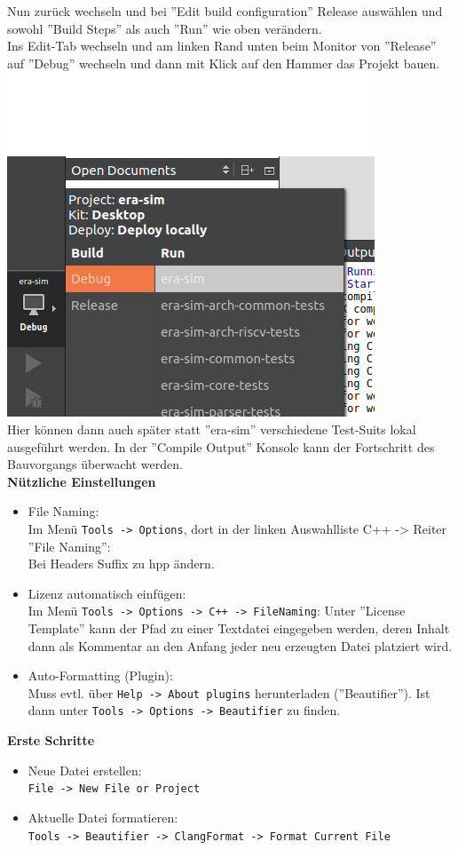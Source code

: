 Nun zurück wechseln und bei ''Edit build configuration'' Release auswählen und sowohl ''Build Steps'' als auch ''Run'' wie oben verändern.\\

Ins Edit-Tab wechseln und am linken Rand unten beim Monitor von ''Release'' auf ''Debug'' wechseln und dann mit Klick auf den Hammer das Projekt bauen.\\
\includegraphics[scale=0.7]{images/setup-qtcreator-change-buildrun-flavor.png}\\
Hier können dann auch später statt ''era-sim'' verschiedene Test-Suits lokal ausgeführt werden. In der ''Compile Output'' Konsole kann der Fortschritt des Bauvorgangs überwacht werden.\\


\textbf{Nützliche Einstellungen}\\
\begin{itemize}
	\item File Naming:\\
	Im Menü \texttt{Tools -> Options}, dort in der linken Auswahlliste C++ -> Reiter ''File Naming'':\\
	Bei Headers Suffix zu hpp ändern.
	\item Lizenz automatisch einfügen:\\
	Im Menü \texttt{Tools -> Options -> C++ -> FileNaming}: Unter ''License Template'' kann der Pfad zu einer Textdatei eingegeben werden, deren Inhalt dann als Kommentar an den Anfang jeder neu erzeugten Datei platziert wird.
	\item Auto-Formatting (Plugin):\\
	 Muss evtl. über \texttt{Help -> About plugins} herunterladen (''Beautifier''). Ist dann unter \texttt{Tools -> Options -> Beautifier} zu finden.
\end{itemize}

\textbf{Erste Schritte}\\
\begin{itemize}
	\item Neue Datei erstellen:\\
	\texttt{File -> New File or Project}
	\item Aktuelle Datei formatieren:\\
	\texttt{Tools -> Beautifier -> ClangFormat -> Format Current File}
\end{itemize}


